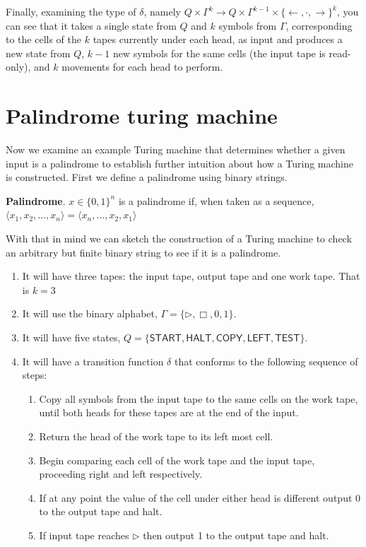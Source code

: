 \documentclass[usletter]{article}
\begin{document}
Finally, examining the type of $\delta$, namely $Q \times \Gamma^{k} \rightarrow Q \times \Gamma^{k-1} \times \{\leftarrow, \cdot, \rightarrow\} ^k$, you can see that it takes a single state from $Q$ and $k$ symbols from $\Gamma$, corresponding to the cells of the $k$ tapes currently under each head, as input and produces a new state from $Q$, $k-1$ new symbols for the same cells (the input tape is read-only), and $k$ movements for each head to perform.

\section{Palindrome turing machine}

Now we examine an example Turing machine that determines whether a given input is a palindrome to establish further intuition about how a Turing machine is constructed. First we define a palindrome using binary strings.

\begin{definition}
  \textbf{Palindrome}. $x \in \{0, 1\}^n$ is a palindrome if, when taken as a sequence, $\langle x_1,x_2,\ldots,x_n \rangle = \langle x_n,\ldots,x_2,x_1\rangle$
\end{definition}

With that in mind we can sketch the construction of a Turing machine to check an arbitrary but finite binary string to see if it is a palindrome.

\begin{enumerate}
  \item It will have three tapes: the input tape, output tape and one work tape. That is $k = 3$
  \item It will use the binary alphabet, $\Gamma = \{\rhd, \Box, 0, 1\}$.
  \item It will have five states, $Q = \{ \textsf{START}, \textsf{HALT}, \textsf{COPY}, \textsf{LEFT}, \textsf{TEST}\} $.
  \item It will have a transition function $\delta$ that conforms to the following sequence of steps:
    \begin{enumerate}
      \item Copy all symbols from the input tape to the same cells on the work tape, until both heads for these tapes are at the end of the input.
      \item Return the head of the work tape to its left most cell.
      \item Begin comparing each cell of the work tape and the input tape, proceeding right and left respectively.
      \item If at any point the value of the cell under either head is different output 0 to the output tape and halt.
      \item If input tape reaches $\rhd$ then output 1 to the output tape and halt.
    \end{enumerate}
\end{enumerate}
\end{document}
